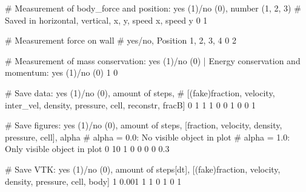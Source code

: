 # Measurement of body_force and position: yes (1)/no (0), number (1, 2, 3)
# Saved in horizontal, vertical, x, y, speed x, speed y
0 1

# Measurement force on wall
# yes/no, Position 1, 2, 3, 4
0 2

# Measurement of mass conservation: yes (1)/no (0) | Energy conservation and momentum: yes (1)/no (0)
1 0

# Save data: yes (1)/no (0), amount of steps,
# [(fake)fraction, velocity, inter_vel, density, pressure, cell, reconstr, fracB]
0	1	1 1 0 0 1 0 0 1

# Save figures: yes (1)/no (0), amount of steps, [fraction, velocity, density, pressure, cell], alpha
# alpha = 0.0: No visible object in plot
# alpha = 1.0: Only visible object in plot
0 	10	1 0 0 0 0	0.3

# Save VTK: yes (1)/no (0), amount of steps[dt], [(fake)fraction, velocity, density, pressure, cell, body]
1 	0.001	1 1 0 1 0 1

